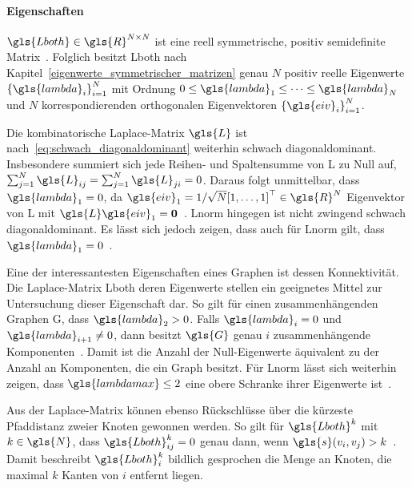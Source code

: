 \paragraph{Eigenschaften}
\label{laplace_eigenschaften}

$\gls{Lboth} \in \gls{R}^{N \times N}$ ist eine reell symmetrische, positiv semidefinite Matrix~\cite{Chung}.
Folglich besitzt \gls{Lboth} nach Kapitel~\ref{eigenwerte_symmetrischer_matrizen} genau $N$ positiv reelle Eigenwerte ${\left\{\gls{lambda}_i\right\}}_{i=1}^N$ mit Ordnung $0 \leq \gls{lambda}_1 \leq \cdots \leq \gls{lambda}_N$ und $N$ korrespondierenden orthogonalen Eigenvektoren ${\left\{\gls{eiv}_i\right\}}_{i=1}^N$.

Die kombinatorische Laplace-Matrix $\gls{L}$ ist nach~\eqref{eq:schwach_diagonaldominant} weiterhin schwach diagonaldominant.
Insbesondere summiert sich jede Reihen- und Spaltensumme von \gls{L} zu Null auf, \dhe{} $\sum_{j=1}^N \gls{L}_{ij} = \sum_{j=1}^N \gls{L}_{ji} = 0$.
Daraus folgt unmittelbar, dass $\gls{lambda}_1 = 0$, da $\gls{eiv}_1 = 1/\sqrt{N}{\left[1, \ldots, 1\right]}^{\top} \in \gls{R}^N$ Eigenvektor von \gls{L} mit $\gls{L}\gls{eiv}_1 = \ve{0}$~\cite{Shuman}.
\gls{Lnorm} hingegen ist nicht zwingend schwach diagonaldominant.
Es lässt sich jedoch zeigen, dass auch für \gls{Lnorm} gilt, dass $\gls{lambda}_1 = 0$~\cite{Chung}.

Eine der interessantesten Eigenschaften eines Graphen ist dessen Konnektivität.
Die Laplace-Matrix \gls{Lboth} \bzw{} deren Eigenwerte stellen ein geeignetes Mittel zur Untersuchung dieser Eigenschaft dar.
So gilt \zB{} für einen zusammenhängenden Graphen \gls{G}, dass $\gls{lambda}_2 > 0$.
Falls $\gls{lambda}_i = 0$ und $\gls{lambda}_{i+1} \neq 0$, dann besitzt $\gls{G}$ genau $i$ zusammenhängende Komponenten~\cite{Chung}.
Damit ist die Anzahl der Null-Eigenwerte äquivalent zu der Anzahl an Komponenten, die ein Graph besitzt.
Für \gls{Lnorm} lässt sich weiterhin zeigen, dass $\gls{lambdamax} \leq 2$ eine obere Schranke ihrer Eigenwerte ist~\cite{Chung}.

Aus der Laplace-Matrix können ebenso Rückschlüsse über die kürzeste Pfaddistanz zweier Knoten gewonnen werden.
So gilt für $\gls{Lboth}^{k}$ mit $k \in \gls{N}$, dass $\gls{Lboth}^k_{ij} = 0$ genau dann, wenn $\gls{s}\left(v_i, v_j\right) > k$~\cite{Hammond}.
Damit beschreibt $\gls{Lboth}^k_i$ bildlich gesprochen die Menge an Knoten, die maximal $k$ Kanten von $i$ entfernt liegen.
